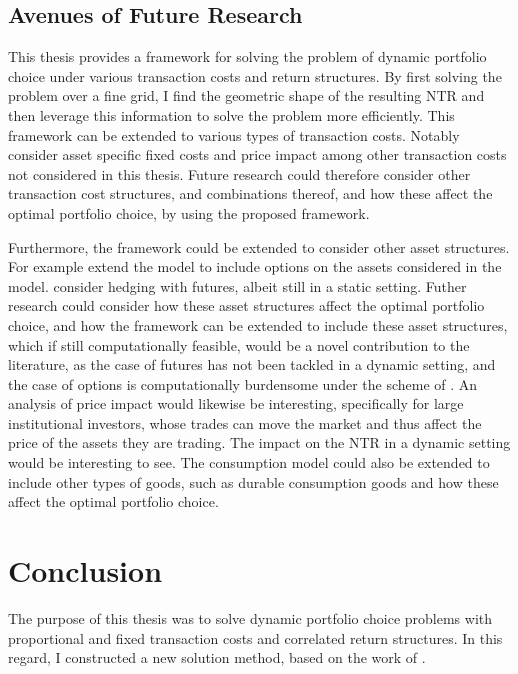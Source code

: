 \documentclass[11pt]{article}
\begin{document}
\subsection{Avenues of Future Research} \label{Subsection: Future Research}
This thesis provides a framework for solving the problem of dynamic portfolio choice under various transaction costs and return structures.
By first solving the problem over a fine grid, I find the geometric shape of the resulting \ac{NTR} and then leverage this information to solve the problem more efficiently.
This framework can be extended to various types of transaction costs. Notably \autocite{Dybvig2020} consider asset specific fixed costs and price impact
among other transaction costs not considered in this thesis. Future research could therefore consider other transaction cost structures, and combinations thereof,
and how these affect the optimal portfolio choice, by using the proposed framework.

Furthermore, the framework could be extended to consider other asset structures.
For example \autocite{CaiJuddXu2020} extend the model to include options on the assets considered in the model.
\autocite{Dybvig2020} consider hedging with futures, albeit still in a static setting.
Futher research could consider how these asset structures affect the optimal portfolio choice, and how the framework can be extended to include these asset structures,
which if still computationally feasible, would be a novel contribution to the literature, as the case of futures has not been tackled in a dynamic setting,
and the case of options is computationally burdensome under the scheme of \autocite{CaiJuddXu2020}.
An analysis of price impact would likewise be interesting, specifically for large institutional investors,
whose trades can move the market and thus affect the price of the assets they are trading. The impact on the \ac{NTR} in a dynamic setting would be interesting to see.
The consumption model could also be extended to include other types of goods, such as durable consumption goods and how these affect the optimal portfolio choice.

\section{Conclusion} \label{Section: Conclusion}
The purpose of this thesis was to solve dynamic portfolio choice problems with proportional and fixed transaction costs and correlated return structures.
In this regard, I constructed a new solution method, based on the work of \autocite{Scheidegger2023}.
\end{document}
